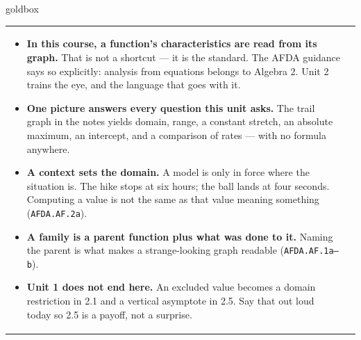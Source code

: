 \documentclass[10pt]{article}
\begin{document}
\begin{skillbox}{goldbox}
\begin{tabularx}{\linewidth}{@{}X|X@{}}
\begin{minipage}[t]{\linewidth}
\begin{itemize}[leftmargin=1.1em, itemsep=2pt, topsep=2pt]
  \item \textbf{In this course, a function's characteristics are read from its graph.} That is not
        a shortcut --- it is the standard. The AFDA guidance says so explicitly: analysis from
        equations belongs to Algebra 2. Unit 2 trains the eye, and the language that goes with it.
  \item \textbf{One picture answers every question this unit asks.} The trail graph in the notes
        yields domain, range, a constant stretch, an absolute maximum, an intercept, and a
        comparison of rates --- with no formula anywhere.
  \item \textbf{A context sets the domain.} A model is only in force where the situation is. The
        hike stops at six hours; the ball lands at four seconds. Computing a value is not the same
        as that value meaning something (\texttt{AFDA.AF.2a}).
  \item \textbf{A family is a parent function plus what was done to it.} Naming the parent is what
        makes a strange-looking graph readable (\texttt{AFDA.AF.1a--b}).
  \item \textbf{Unit 1 does not end here.} An excluded value becomes a domain restriction in 2.1
        and a vertical asymptote in 2.5. Say that out loud today so 2.5 is a payoff, not a
        surprise.
\end{itemize}
\end{minipage}
\end{tabularx}
\end{skillbox}
\end{document}
